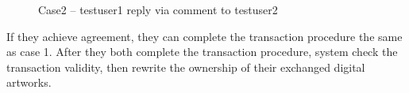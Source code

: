 \begin{figure}[!h]
\begin{minipage}{0.5\textwidth}
        \caption{Case2 -- testuser1 reply via comment to testuser2}
        \label{fig: case2-1}
    \end{minipage}
\end{figure}

If they achieve agreement, they can complete the transaction procedure the same as case 1. After they both complete the transaction procedure, system check the transaction validity, then rewrite the ownership of their exchanged digital artworks.
